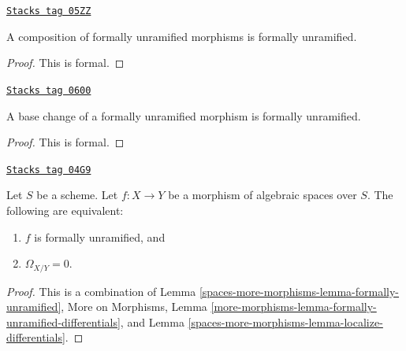 \begin{lemma}
\label{spaces-more-morphisms-lemma-composition-formally-unramified}
\href{https://stacks.math.columbia.edu/tag/05ZZ}{\texttt{Stacks tag 05ZZ}}

A composition of formally unramified morphisms is formally unramified.
\end{lemma}

\begin{proof}
This is formal.
\end{proof}

\begin{lemma}
\label{spaces-more-morphisms-lemma-base-change-formally-unramified}
\href{https://stacks.math.columbia.edu/tag/0600}{\texttt{Stacks tag 0600}}

A base change of a formally unramified morphism is formally unramified.
\end{lemma}

\begin{proof}
This is formal.
\end{proof}

\begin{lemma}
\label{spaces-more-morphisms-lemma-characterize-formally-unramified}
\href{https://stacks.math.columbia.edu/tag/04G9}{\texttt{Stacks tag 04G9}}

Let $S$ be a scheme. Let $f : X \to Y$ be a morphism of algebraic spaces over
$S$. The following are equivalent:
\begin{enumerate}
\item $f$ is formally unramified, and
\item $\Omega_{X/Y} = 0$.
\end{enumerate}
\end{lemma}

\begin{proof}
This is a combination of
Lemma \ref{spaces-more-morphisms-lemma-formally-unramified},
More on Morphisms,
Lemma \ref{more-morphisms-lemma-formally-unramified-differentials},
and
Lemma \ref{spaces-more-morphisms-lemma-localize-differentials}.
\end{proof}

